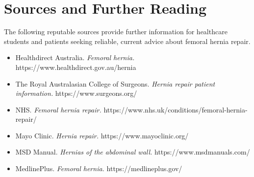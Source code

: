 \section*{Sources and Further Reading}
The following reputable sources provide further information for healthcare students and patients seeking reliable, current advice about femoral hernia repair.
\begin{itemize}
    \item Healthdirect Australia. \textit{Femoral hernia.} https://www.healthdirect.gov.au/hernia
    \item The Royal Australasian College of Surgeons. \textit{Hernia repair patient information.} https://www.surgeons.org/
    \item NHS. \textit{Femoral hernia repair.} https://www.nhs.uk/conditions/femoral-hernia-repair/
    \item Mayo Clinic. \textit{Hernia repair.} https://www.mayoclinic.org/
    \item MSD Manual. \textit{Hernias of the abdominal wall.} https://www.msdmanuals.com/
    \item MedlinePlus. \textit{Femoral hernia.} https://medlineplus.gov/
\end{itemize}
